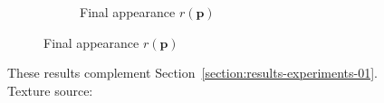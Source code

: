 \begin{figure}[]
\begin{subfigure}{\textwidth}
\begin{subfigure}{0.24\textwidth}
            \caption*{Final appearance \(r(\bm{p})\)}
        \end{subfigure}
    \end{subfigure}
    \caption{These results complement Section~\ref{section:results-experiments-01}. Texture source: \citet{Gatys2015}}
    \label{fig:ex01-complete-pebbles-1000steps}
\end{figure}

